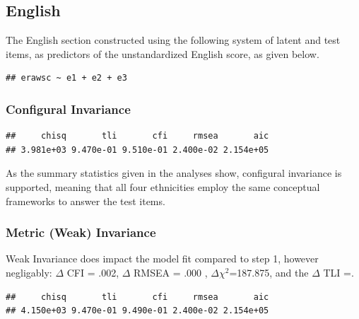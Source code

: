 \documentclass{article}\usepackage[]{graphicx}\usepackage[]{color}
\makeatletter
\newenvironment{kframe}{%
 \def\at@end@of@kframe{}%
 \ifinner\ifhmode%
  \def\at@end@of@kframe{\end{minipage}}%
  \begin{minipage}{\columnwidth}%
 \fi\fi%
 \def\FrameCommand##1{\hskip\@totalleftmargin \hskip-\fboxsep
 \colorbox{shadecolor}{##1}\hskip-\fboxsep
     \hskip-\linewidth \hskip-\@totalleftmargin \hskip\columnwidth}%
 \MakeFramed {\advance\hsize-\width
   \@totalleftmargin\z@ \linewidth\hsize
   \@setminipage}}%
 {\par\unskip\endMakeFramed%
 \at@end@of@kframe}
\newenvironment{knitrout}{}{} %
\makeatother
\begin{document}
\subsection{English}
The English section constructed using the following system of latent and test items, as predictors of the unstandardized English score, as given below.
\begin{knitrout}
\color{fgcolor}\begin{kframe}
\begin{verbatim}
## erawsc ~ e1 + e2 + e3
\end{verbatim}
\end{kframe}
\end{knitrout}


\subsubsection{Configural Invariance}
\begin{knitrout}
\color{fgcolor}\begin{kframe}
\begin{verbatim}
##     chisq       tli       cfi     rmsea       aic 
## 3.981e+03 9.470e-01 9.510e-01 2.400e-02 2.154e+05
\end{verbatim}
\end{kframe}
\end{knitrout}

As the summary statistics given in the analyses show, configural invariance is supported, meaning that all four ethnicities employ the same conceptual frameworks to answer the test items. 
\subsubsection{Metric (Weak) Invariance}
Weak Invariance does impact the model fit compared to step 1, however negligably: $\Delta$ CFI = .002, $\Delta$ RMSEA = .000 , $\Delta$$\chi^2$=187.875, and the $\Delta$ TLI =.

\begin{knitrout}
\color{fgcolor}\begin{kframe}
\begin{verbatim}
##     chisq       tli       cfi     rmsea       aic 
## 4.150e+03 9.470e-01 9.490e-01 2.400e-02 2.154e+05
\end{verbatim}
\end{kframe}
\end{knitrout}
\end{document}
